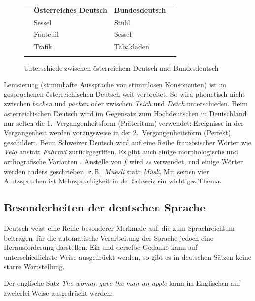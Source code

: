 \documentclass[]{../../metanetpaper}
\begin{document}
\begin{multicols}{2}
\begin{figure}[htb]
  \setlength{\tabcolsep}{3.3em}
  \begin{tabularx}{\textwidth}{llll} \toprule\addlinespace
    & \textbf{Österreiches Deutsch} & \textbf{Bundesdeutsch} & \\ 
\addlinespace\midrule\addlinespace
    & Sessel   & Stuhl      & \\ 
    & Fauteuil & Sessel     & \\ 
    & Trafik   & Tabakladen & \\ \addlinespace\bottomrule
  \end{tabularx}
  \caption{Unterschiede zwischen österreichem Deutsch und Bundesdeutsch}
  \label{atgetabelle_de}
\end{figure}

Lenisierung (stimmhafte Aussprache von stimmlosen Konsonanten) ist im gesprochenen österreichischen Deutsch weit verbreitet. So wird phonetisch nicht zwischen \textit{backen} und \textit{packen} oder zwischen \textit{Teich} und \textit{Deich} unterschieden. Beim österreichischen Deutsch wird im Gegensatz zum Hochdeutschen in Deutschland nur selten die 1.~Vergangenheitsform (Präteritum) verwendet: Ereignisse in der Vergangenheit werden vorzugsweise in der 2.~Vergangenheitsform (Perfekt) geschildert. 
Beim Schweizer Deutsch wird auf eine Reihe französischer Wörter wie \textit{Velo} anstatt \textit{Fahrrad} zurückgegriffen. Es gibt auch einige morphologische und orthografische Varianten \cite{Cano1}. Anstelle von \textit{ß} wird \textit{ss} verwendet, und einige Wörter werden anders geschrieben, z.\,B.~\textit{Müesli} statt \textit{Müsli}. Mit seinen vier Amtssprachen ist Mehrsprachigkeit in der Schweiz ein wichtiges Thema.


\subsection{Besonderheiten der deutschen Sprache}

Deutsch weist eine Reihe besonderer Merkmale auf, die zum Sprachreichtum beitragen, für die automatische Verarbeitung der Sprache jedoch eine Herausforderung darstellen. Ein und derselbe Gedanke kann auf unterschiedlichste Weise ausgedrückt werden, so gibt es in deutschen Sätzen keine starre Wortstellung.


Der englische Satz \textit{The woman gave the man an apple} kann im Englischen auf zweierlei Weise ausgedrückt werden:


\end{multicols}
\end{document}
